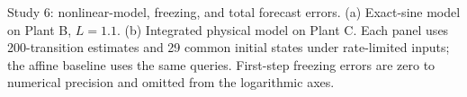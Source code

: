 \caption{Study 6: nonlinear-model, freezing, and total forecast errors.
(a) Exact-sine model on Plant B, $L=1.1$.
(b) Integrated physical model on Plant C.
Each panel uses 200-transition estimates and 29 common initial states
under rate-limited inputs; the affine baseline uses the same queries.
First-step freezing errors are zero to numerical precision and omitted
from the logarithmic axes.}
